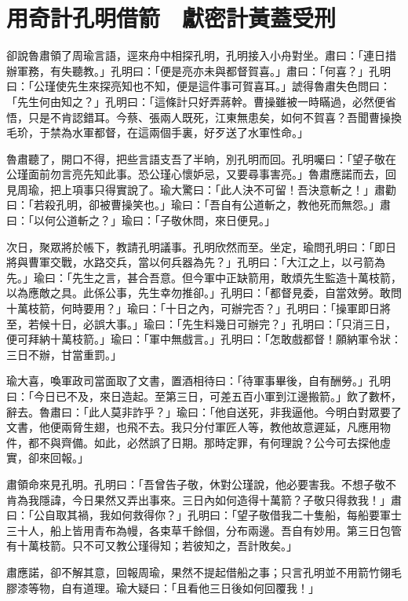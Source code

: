
\chapter{用奇計孔明借箭　獻密計黃蓋受刑}

卻說魯肅領了周瑜言語，逕來舟中相探孔明，孔明接入小舟對坐。肅曰：「連日措辦軍務，有失聽教。」孔明曰：「便是亮亦未與都督賀喜。」肅曰：「何喜？」孔明曰：「公瑾使先生來探亮知也不知，便是這件事可賀喜耳。」諕得魯肅失色問曰：「先生何由知之？」孔明曰：「這條計只好弄蔣幹。曹操雖被一時瞞過，必然便省悟，只是不肯認錯耳。今蔡、張兩人既死，江東無患矣，如何不賀喜？吾聞曹操換毛玠，于禁為水軍都督，在這兩個手裏，好歹送了水軍性命。」

魯肅聽了，開口不得，把些言語支吾了半晌，別孔明而回。孔明囑曰：「望子敬在公瑾面前勿言亮先知此事。恐公瑾心懷妒忌，又要尋事害亮。」魯肅應諾而去，回見周瑜，把上項事只得實說了。瑜大驚曰：「此人決不可留！吾決意斬之！」肅勸曰：「若殺孔明，卻被曹操笑也。」瑜曰：「吾自有公道斬之，教他死而無怨。」肅曰：「以何公道斬之？」瑜曰：「子敬休問，來日便見。」

次日，聚眾將於帳下，教請孔明議事。孔明欣然而至。坐定，瑜問孔明曰：「即日將與曹軍交戰，水路交兵，當以何兵器為先？」孔明曰：「大江之上，以弓箭為先。」瑜曰：「先生之言，甚合吾意。但今軍中正缺箭用，敢煩先生監造十萬枝箭，以為應敵之具。此係公事，先生幸勿推卻。」孔明曰：「都督見委，自當效勞。敢問十萬枝箭，何時要用？」瑜曰：「十日之內，可辦完否？」孔明曰：「操軍即日將至，若候十日，必誤大事。」瑜曰：「先生料幾日可辦完？」孔明曰：「只消三日，便可拜納十萬枝箭。」瑜曰：「軍中無戲言。」孔明曰：「怎敢戲都督！願納軍令狀：三日不辦，甘當重罰。」

瑜大喜，喚軍政司當面取了文書，置酒相待曰：「待軍事畢後，自有酬勞。」孔明曰：「今日已不及，來日造起。至第三日，可差五百小軍到江邊搬箭。」飲了數杯，辭去。魯肅曰：「此人莫非詐乎？」瑜曰：「他自送死，非我逼他。今明白對眾要了文書，他便兩脅生翅，也飛不去。我只分付軍匠人等，教他故意遲延，凡應用物件，都不與齊備。如此，必然誤了日期。那時定罪，有何理說？公今可去探他虛實，卻來回報。」

肅領命來見孔明。孔明曰：「吾曾告子敬，休對公瑾說，他必要害我。不想子敬不肯為我隱諱，今日果然又弄出事來。三日內如何造得十萬箭？子敬只得救我！」肅曰：「公自取其禍，我如何救得你？」孔明曰：「望子敬借我二十隻船，每船要軍士三十人，船上皆用青布為幔，各束草千餘個，分布兩邊。吾自有妙用。第三日包管有十萬枝箭。只不可又教公瑾得知；若彼知之，吾計敗矣。」

肅應諾，卻不解其意，回報周瑜，果然不提起借船之事；只言孔明並不用箭竹翎毛膠漆等物，自有道理。瑜大疑曰：「且看他三日後如何回覆我！」

